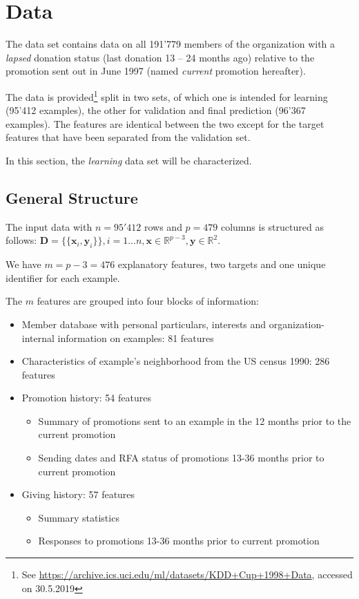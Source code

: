 \documentclass[
  11pt,
  a4paper,
  DIV=12,captions=tableheading,oneside,titlepage]{scrbook}
\providecommand{\tightlist}{%
  \setlength{\itemsep}{0pt}\setlength{\parskip}{0pt}}
\begin{document}
\hypertarget{data}{%
\chapter{Data}\label{data}}

The data set contains data on all 191'779 members of the organization with a \emph{lapsed} donation status (last donation 13 -- 24 months ago) relative to the promotion sent out in June 1997 (named \emph{current} promotion hereafter).

The data is provided\footnote{See \url{https://archive.ics.uci.edu/ml/datasets/KDD+Cup+1998+Data}, accessed on 30.5.2019} split in two sets, of which one is intended for learning (95'412 examples), the other for validation and final prediction (96'367 examples). The features are identical between the two except for the target features that have been separated from the validation set.

In this section, the \emph{learning} data set will be characterized.

\hypertarget{general-structure}{%
\section{General Structure}\label{general-structure}}

The input data with \(n = 95'412\) rows and \(p= 479\) columns is structured as follows: \(\mathbf{D} = \{\{\mathbf{x}_i,\mathbf{y}_i\}\}, i = 1 ... n, \mathbf{x} \in \mathbb{R}^{p-3}, \mathbf{y} \in \mathbb{R}^2\).

We have \(m = p-3 = 476\) explanatory features, two targets and one unique identifier for each example.

The \(m\) features are grouped into four blocks of information:

\begin{itemize}
\tightlist
\item
  Member database with personal particulars, interests and organization-internal information on examples: 81 features
\item
  Characteristics of example's neighborhood from the US census 1990: 286 features
\item
  Promotion history: 54 features

  \begin{itemize}
  \tightlist
  \item
    Summary of promotions sent to an example in the 12 months prior to the current promotion
  \item
    Sending dates and RFA status of promotions 13-36 months prior to current promotion
  \end{itemize}
\item
  Giving history: 57 features

  \begin{itemize}
  \tightlist
  \item
    Summary statistics
  \item
    Responses to promotions 13-36 months prior to current promotion
  \end{itemize}
\end{itemize}
\end{document}

